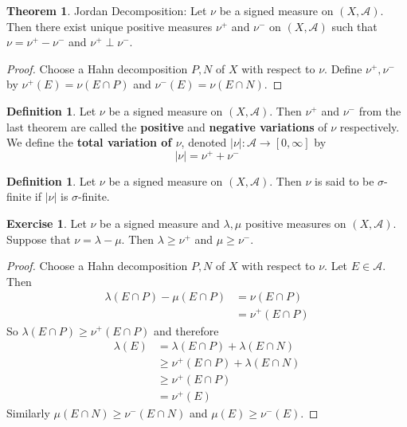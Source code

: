 \documentclass{book}
\theoremstyle{definition}
\newtheorem{defn}[definition]{Definition}
\newtheorem{thm}[definition]{Theorem}
\newtheorem{ex}[definition]{Exercise}
\newcommand{\lam}{\lambda}
\newcommand{\sig}{\sigma}
\newcommand{\MA}{\mathcal{A}}
\newcommand{\lex}[1]{\label{ex:#1}}
\newcommand{\ld}[1]{\label{defn:#1}}
\DeclareMathOperator*{\0}{\mbf{0}}
\DeclareMathOperator*{\1}{\mbf{1}}
\begin{document}
	\begin{thm}{Jordan Decomposition:}
		Let $\nu$ be a signed measure on $(X, \MA)$. Then there exist unique positive measures $\nu^+$ and $\nu^-$ on $(X, \MA)$ such that $\nu = \nu^+ - \nu^-$ and $\nu^+ \perp \nu^-$. 
	\end{thm}
	
	\begin{proof}
		Choose a Hahn decomposition $P,N$ of $X$ with respect to $\nu$. Define $\nu^+, \nu^-$ by $\nu^+(E)= \nu(E \cap P)$ and $\nu^-(E) = \nu(E \cap N)$.
	\end{proof}
	
	\begin{defn} \ld{41008} 
		Let $\nu$ be a signed measure on $(X, \MA)$. Then $\nu^+$ and $\nu^-$ from the last theorem are called the \textbf{positive} and \textbf{negative variations} of $\nu$ respectively. We define the \textbf{total variation of $\nu$}, denoted $|\nu|:\MA \rightarrow [0, \infty]$ by $$|\nu| = \nu^+ + \nu^-$$ 
	\end{defn}
	
	\begin{defn} \ld{41009} 
		Let $\nu$ be a signed measure on $(X,\MA)$. Then $\nu$ is said to be $\sig$-finite if $|\nu|$ is $\sig$-finite.
	\end{defn}
	
	\begin{ex} \lex{41010} 
		Let $\nu$ be a signed measure and $\lam, \mu$ positive measures on $(X,\MA)$. Suppose that $\nu = \lam - \mu$. Then $\lam \geq \nu^+$ and $\mu \geq \nu^-$.
	\end{ex}
	
	\begin{proof}
		Choose a Hahn decomposition $P,N$ of $X$ with respect to $\nu$. Let $E \in \MA$. Then 
		\begin{align*}
			\lam(E \cap P) - \mu(E \cap P) 
			&= \nu(E \cap P)\\
			&= \nu^+(E \cap P)
		\end{align*}
		So $\lam(E \cap P) \geq  \nu^+(E \cap P) $ and therefore 
		\begin{align*}
			\lam(E) 
			&= \lam(E \cap P) + \lam(E \cap N)\\
			& \geq \nu^+(E \cap P) + \lam (E \cap N)\\
			& \geq \nu^+(E \cap P)\\
			& = \nu^+(E)
		\end{align*} 
		Similarly $\mu(E \cap N) \geq \nu^-(E \cap N)$ and $\mu(E) \geq \nu^-(E)$.
	\end{proof}
	
\end{document}
